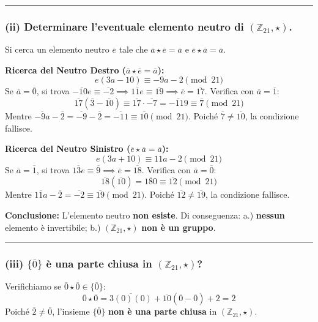\vspace{0.3cm}
\hrule
\vspace{0.3cm}

\subsubsection*{(ii) Determinare l'eventuale elemento neutro di $(\mathbb{Z}_{21}, \star)$.}

Si cerca un elemento neutro $\overline{e}$ tale che $\overline{a} \star \overline{e} = \overline{a}$ e $\overline{e} \star \overline{a} = \overline{a}$.

\textbf{Ricerca del Neutro Destro ($\overline{a} \star \overline{e} = \overline{a}$):}
$$ e(3a - 10) \equiv -9a - 2 \pmod{21} $$
Se $\overline{a}=\overline{0}$, si trova $\overline{-10e} \equiv \overline{-2} \implies \overline{11e} \equiv \overline{19} \implies \overline{e} = \overline{17}$.
Verifica con $\overline{a}=\overline{1}$:
$$ \overline{17}(\overline{3} - \overline{10}) \equiv \overline{17} \cdot \overline{-7} = \overline{-119} \equiv \overline{7} \pmod{21} $$
Mentre $\overline{-9a} - \overline{2} = \overline{-9} - \overline{2} = \overline{-11} \equiv \overline{10} \pmod{21}$. Poiché $\overline{7} \ne \overline{10}$, la condizione fallisce.

\textbf{Ricerca del Neutro Sinistro ($\overline{e} \star \overline{a} = \overline{a}$):}
$$ e(3a + 10) \equiv 11a - 2 \pmod{21} $$
Se $\overline{a}=\overline{1}$, si trova $\overline{13e} \equiv \overline{9} \implies \overline{e} = \overline{18}$.
Verifica con $\overline{a}=\overline{0}$:
$$ \overline{18}(\overline{10}) = \overline{180} \equiv \overline{12} \pmod{21} $$
Mentre $\overline{11a} - \overline{2} = \overline{-2} \equiv \overline{19} \pmod{21}$. Poiché $\overline{12} \ne \overline{19}$, la condizione fallisce.

\textbf{Conclusione:} L'elemento neutro \textbf{non esiste}.
Di conseguenza: a.) \textbf{nessun} elemento è invertibile; b.) $(\mathbb{Z}_{21}, \star)$ \textbf{non è un gruppo}.

\vspace{0.3cm}
\hrule
\vspace{0.3cm}

\subsubsection*{(iii) $\{\overline{0}\}$ è una parte chiusa in $(\mathbb{Z}_{21}, \star)$?}

Verifichiamo se $\overline{0} \star \overline{0} \in \{\overline{0}\}$:
$$ \overline{0} \star \overline{0} = \overline{3(0)(0)} + \overline{10}(\overline{0} - \overline{0}) + \overline{2} = \overline{2} $$
Poiché $\overline{2} \ne \overline{0}$, l'insieme $\{\overline{0}\}$ \textbf{non è una parte chiusa} in $(\mathbb{Z}_{21}, \star)$.

